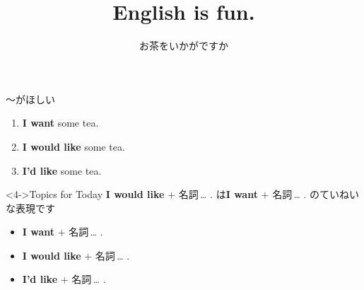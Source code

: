 \documentclass[aspectratio=169,xcolor={dvipsnames,table}]{beamer}
\title{English is fun.}
\subtitle{お茶をいかがですか}
\author{}
\institute[]{}
\date[]
\begin{document}
\begin{frame}[plain]
  \titlepage
\end{frame}


\begin{frame}[plain]{～がほしい}
\large
 \begin{enumerate}
  \item<1-> \textbf{I want} some tea.\hfill{\scriptsize {}}
  \item<2-> \textbf{I would like} some tea.\hfill{\scriptsize {}}
  \item<3-> {\bfseries I'd like} some tea.
 \end{enumerate}

\begin{block}<4->{Topics for Today}\small
\textbf{I would like} $+$ 名詞\,\ldots\,\,.\,\,は\textbf{I want} $+$ 名詞\,\ldots\,\,.\,\,のていねいな表現です
\begin{itemize}[square]\small
 \item \textbf{I want} $+$ 名詞\,\ldots\,\,.
 \item \textbf{I would like} $+$ 名詞\,\ldots\,\,.
 \item \textbf{I'd like} $+$ 名詞\,\ldots\,\,.
       \end{itemize}
\end{block}

\hfill{\scriptsize {}}
\end{frame}
\end{document}
